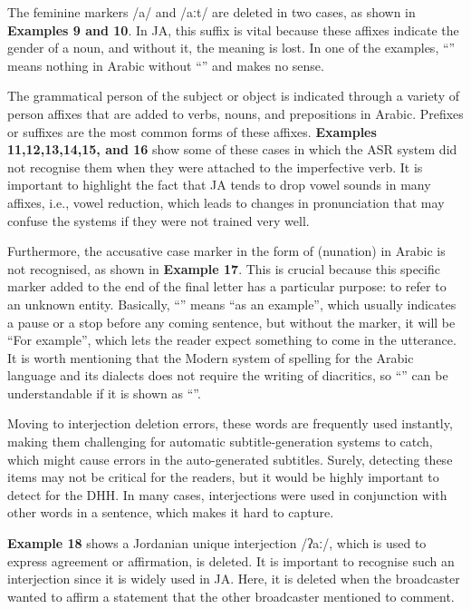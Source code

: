 \documentclass[english]{textolivre}
\newcommand{\ipa}[1]{{\ipafont #1}}
\begin{document}
The feminine markers \ipa{/a/} and \ipa{/aːt/} are deleted in two cases, as shown in
\textbf{Examples 9 and 10}. In JA, this suffix is vital because these
affixes indicate the gender of a noun, and without it, the meaning is
lost. In one of the examples, ``'' means nothing in Arabic
without ``'' and makes no sense.

The grammatical person of the subject or object is indicated through a
variety of person affixes that are added to verbs, nouns, and
prepositions in Arabic. Prefixes or suffixes are the most common forms
of these affixes. \textbf{Examples 11,12,13,14,15, and 16} show some of
these cases in which the ASR system did not recognise them when they
were attached to the imperfective verb. It is important to highlight the
fact that JA tends to drop vowel sounds in many affixes, i.e., vowel
reduction, which leads to changes in pronunciation that may confuse the
systems if they were not trained very well.

Furthermore, the accusative case marker in the form of (nunation) in
Arabic is not recognised, as shown in \textbf{Example 17}. This is
crucial because this specific marker added to the end of the final
letter has a particular purpose: to refer to an unknown entity.
Basically, ``'' means ``as an example'', which usually
indicates a pause or a stop before any coming sentence, but without the
marker, it will be ``For example'', which lets the reader expect
something to come in the utterance. It is worth mentioning that the
Modern system of spelling for the Arabic language and its dialects does
not require the writing of diacritics, so ``'' can be
understandable if it is shown as ``''.

Moving to interjection deletion errors, these words are frequently used
instantly, making them challenging for automatic subtitle-generation
systems to catch, which might cause errors in the auto-generated
subtitles. Surely, detecting these items may not be critical for the
readers, but it would be highly important to detect for the DHH. In many
cases, interjections were used in conjunction with other words in a
sentence, which makes it hard to capture.

\textbf{Example 18} shows a Jordanian unique interjection \ipa{/ʔaː/}, which
is used to express agreement or affirmation, is deleted. It is important
to recognise such an interjection since it is widely used in JA. Here,
it is deleted when the broadcaster wanted to affirm a statement that the
other broadcaster mentioned to comment.
\end{document}
